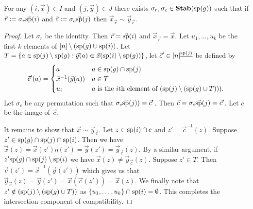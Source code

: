 \documentclass[../paper.tex]{subfiles}
\begin{document}
\begin{lem}
  \label{lem:permutation-row-column}
  For any $(i, \vec{x}) \in I$ and $(j, \vec{y}) \in J$ there exists $\sigma_r,
  \sigma_c \in \text{\textbf{Stab}} (\text{sp} (g))$ such that if $\vec{r} := \sigma_r \vec{\text{sp}}(i)$
  and $\vec{c} := \sigma_c \vec{\text{sp}}(j)$ then $\vec{x}_{\vec{r}} \sim
  \vec{y}_{\vec{c}}$.
\end{lem}
\begin{proof}
  Let $\sigma_r$ be the identity. Then $\vec{r} = \vec{\text{sp}}(i)$ and
  $\vec{x}_{\vec{r}} = \vec{x}$. Let $u_1, \ldots , u_k$ be the first $k$
  elements of $[n] \setminus (\text{sp}(g) \cup \text{sp}(i))$. Let $T = \{a \in
  \text{sp}(j) \setminus \text{sp}(g) : \vec{y}(a) \in \vec{x}(\text{sp}(i) \setminus
  \text{sp}(g))\}$, let $\vec{c}' \in [n]^{\underline{\text{sp}(j)}}$ be defined by
  \[
    \vec{c}' (a) =
    \begin{cases}
      a & a \in \text{sp}(g) \cap \text{sp}(j)\\
      \vec{x}^{-1}(\vec{y}(a)) & a \in T\\
      u_{i} & \text{$a$ is the $i$th element of $(\text{sp}(j) \setminus (\text{sp}(g)
        \cup T)))$}.
    \end{cases}
  \]
  Let $\sigma_c$ be any permutation such that $\sigma_c \vec{\text{sp}}(j)) =
  \vec{c}'$. Then $\vec{c} = \sigma_c \vec{\text{sp}}(j) = \vec{c}'$. Let $c$ be
  the image of $\vec{c}$.

  It remains to show that $\vec{x} \sim \vec{y}_{\vec{c}}$. Let $z \in \text{sp}(i)
  \cap c$ and $z' = \vec{c}^{-1}(z)$. Suppose $z' \in \text{sp}(g)\cap \text{sp}(j)
  \cap \text{sp}(i)$. Then we have $\vec{x}(z) = \vec{x}(z') \eta (z') =
  \vec{y}(z') = \vec{y}_{\vec{c}}(z)$. By a similar argument, if $z' \text{sp}(g)
  \cap \text{sp}(j) \setminus \text{sp}(i)$ we have $\vec{x}(z) \neq
  \vec{y}_{\vec{c}}(z)$. Suppose $z' \in T$. Then $\vec{c}(z') =
  \vec{x}^{-1}(\vec{y}(z'))$ which gives us that $\vec{y}_{\vec{c}}(z) =
  \vec{y}(z') = \vec{x}(\vec{c}(z')) = \vec{x}(z)$. We finally note that $z'
  \notin (\text{sp}(j) \setminus (\text{sp}(g) \cup T))$ as $\{u_1 , \ldots , u_k\}
  \cap \text{sp}(i) = \emptyset$. This completes the intersection component of
  compatibility.


\end{proof}
\end{document}
